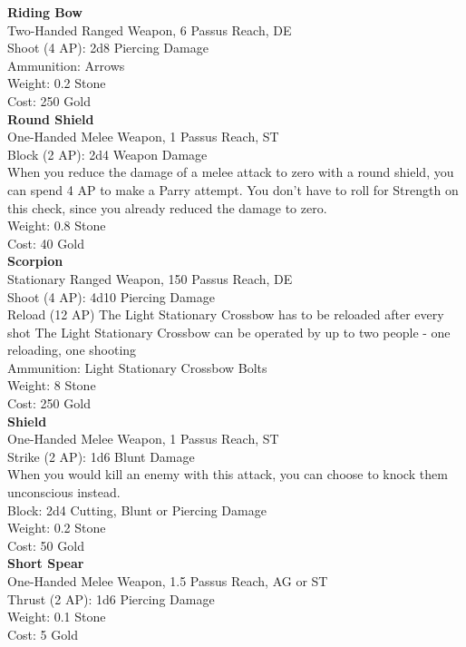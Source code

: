 \textbf{Riding Bow}\\
Two-Handed Ranged Weapon, 6 Passus Reach, DE\\
Shoot (4 AP): 2d8 Piercing Damage\\
Ammunition: Arrows\\
Weight: 0.2 Stone\\
Cost: 250 Gold\\


\textbf{Round Shield}\\
One-Handed Melee Weapon, 1 Passus Reach, ST\\
Block (2 AP): 2d4 Weapon Damage\\
When you reduce the damage of a melee attack to zero with a round shield, you can spend 4 AP to make a Parry attempt. You don't have to roll for Strength on this check, since you already reduced the damage to zero.\\
Weight: 0.8 Stone\\
Cost: 40 Gold\\


\textbf{Scorpion}\\
Stationary Ranged Weapon, 150 Passus Reach, DE\\
Shoot (4 AP): 4d10 Piercing Damage\\
Reload (12 AP) The Light Stationary Crossbow has to be reloaded after every shot
The Light Stationary Crossbow can be operated by up to two people - one reloading, one shooting\\
Ammunition: Light Stationary Crossbow Bolts\\
Weight: 8 Stone\\
Cost: 250 Gold\\


\textbf{Shield}\\
One-Handed Melee Weapon, 1 Passus Reach, ST\\
Strike (2 AP): 1d6 Blunt Damage\\
When you would kill an enemy with this attack, you can choose to knock them unconscious instead.\\
Block: 2d4 Cutting, Blunt or Piercing Damage\\
Weight: 0.2 Stone\\
Cost: 50 Gold\\


\textbf{Short Spear}\\
One-Handed Melee Weapon, 1.5 Passus Reach, AG or ST\\
Thrust (2 AP): 1d6 Piercing Damage\\
Weight: 0.1 Stone\\
Cost: 5 Gold\\



